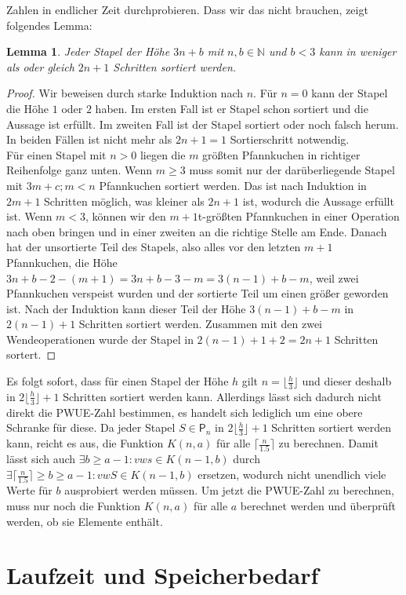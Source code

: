\documentclass[a4paper,10pt,ngerman]{scrartcl}
\newtheorem{lemma}[theorem]{Lemma}
\begin{document}
Zahlen in endlicher Zeit durchprobieren. Dass wir das nicht brauchen, zeigt folgendes Lemma:
\begin{lemma}
  Jeder Stapel der Höhe $3n+b$ mit $n,b\in \mathbb{N}$ und $b<3$ kann in weniger als oder gleich $2n+1$ Schritten sortiert werden.
\end{lemma}
\begin{proof}
  Wir beweisen durch starke Induktion nach $n$. Für $n=0$ kann der Stapel die Höhe $1$ oder $2$ haben. Im ersten Fall ist er Stapel schon sortiert
  und die Aussage ist erfüllt. Im zweiten Fall ist der Stapel sortiert oder noch falsch herum. In beiden Fällen ist nicht mehr als $2n+1=1$ Sortierschritt
  notwendig. \\
  Für einen Stapel mit $n>0$ liegen die $m$ größten Pfannkuchen in richtiger Reihenfolge ganz unten. Wenn $m\geq3$ muss somit nur der darüberliegende Stapel mit $3m+c;m<n$ Pfannkuchen
  sortiert werden. Das ist nach Induktion in $2m+1$ Schritten möglich, was kleiner als $2n+1$ ist, wodurch die Aussage erfüllt ist. Wenn $m<3$, können wir den $m+1$t-größten Pfannkuchen
  in einer Operation nach oben bringen und in einer zweiten an die richtige Stelle am Ende. Danach hat der unsortierte Teil des Stapels, also alles vor den letzten $m+1$ Pfannkuchen,
  die Höhe $3n+b-2-(m+1)=3n+b-3-m=3(n-1)+b-m$, weil zwei Pfannkuchen verspeist wurden und der sortierte Teil um einen größer geworden ist. Nach der Induktion kann dieser Teil der Höhe
  $3(n-1)+b-m$ in $2(n-1)+1$ Schritten sortiert werden. Zusammen mit den zwei Wendeoperationen wurde der Stapel in $2(n-1)+1+2=2n+1$ Schritten sortert.
\end{proof}
Es folgt sofort, dass für einen Stapel der Höhe $h$ gilt $n=\lfloor\frac{h}{3}\rfloor$ und dieser deshalb in $2\lfloor\frac{h}{3}\rfloor+1$ Schritten sortiert werden kann.
Allerdings lässt sich dadurch nicht direkt die PWUE-Zahl bestimmen, es handelt sich lediglich um eine obere Schranke für diese.
Da jeder Stapel $S \in \mathsf{P}_n$ in $2\lfloor\frac{h}{3}\rfloor+1$ Schritten sortiert werden kann, reicht es aus, 
die Funktion $K(n,a)$ für alle $\lceil \frac{n}{1.5}\rceil$ zu berechnen.
Damit lässt sich auch $\exists b \geq a-1: vws \in K(n-1,b)$ durch $\exists \lceil \frac{n}{1.5}\rceil \geq b \geq a-1: vwS \in K(n-1,b)$ 
ersetzen, wodurch nicht unendlich viele Werte für $b$
ausprobiert werden müssen.
Um jetzt die PWUE-Zahl zu berechnen, muss nur noch die Funktion $K(n,a)$ für alle $a$ berechnet werden und überprüft werden, ob sie Elemente enthält.
\section{Laufzeit und Speicherbedarf}
\end{document}
